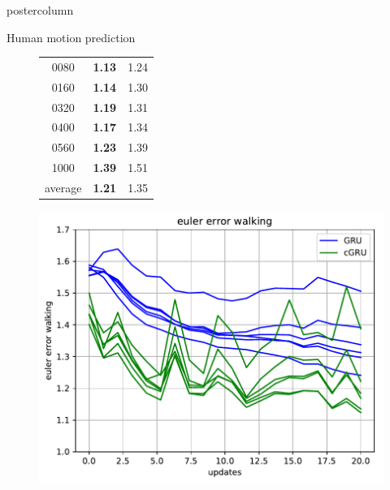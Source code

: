\documentclass{beamer}
\begin{document}
\begin{frame}
\begin{columns}
\begin{column}{.57\textwidth}
\begin{beamercolorbox}[center]{postercolumn}
\begin{minipage}{.98\textwidth}
{\begin{myblock}{Human motion prediction}
\begin{figure}
\begin{minipage}{0.25\textwidth}
\begin{tabular}{|c|c|c|}
                                    0080     &   \textbf{1.13}                  & 1.24                           \\
                                    0160     &   \textbf{1.14}                  & 1.30                           \\
                                    0320     &   \textbf{1.19}                  & 1.31                           \\
                                    0400     &   \textbf{1.17}                  & 1.34                           \\
                                    0560     &   \textbf{1.23}                  & 1.39                           \\
                                    1000     &   \textbf{1.39}                  & 1.51                           \\ \hline
                                    average  &   \textbf{1.21}                  & 1.35                           \\ \hline
                                \end{tabular}
                            \end{minipage}
                            \begin{minipage}[c]{.45\textwidth}
                            \centering
                            \includegraphics[scale=1.0]{img/euler.pdf}
                            \end{minipage}

\end{figure}
\end{myblock}}
\end{minipage}
\end{beamercolorbox}
\end{column}
\end{columns}
\end{frame}
\end{document}
